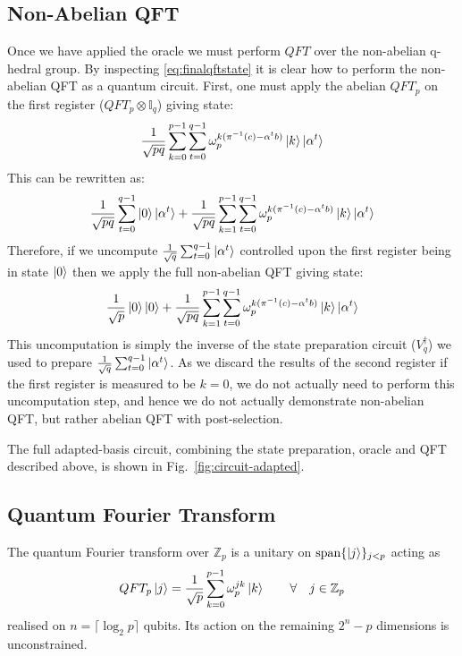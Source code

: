 \subsection{Non-Abelian QFT}
Once we have applied the oracle we must perform $QFT$ over the non-abelian q-hedral group. By inspecting \eqref{eq:finalqftstate} it is clear how to perform the non-abelian QFT as a quantum circuit. First, one must apply the abelian $QFT_p$ on the first register ($QFT_p \otimes \mathbb{I}_q$) giving state:
\begin{equation}
    \frac{1}{\sqrt{pq}} \sum_{k=0}^{p-1}\sum_{t = 0}^{q-1} \omega_p^{k (\pi^{-1}(c) - \alpha^tb)}\ket{k}\ket{\alpha^t}
\end{equation}
This can be rewritten as:
\begin{equation}
  \frac{1}{\sqrt{pq}}\sum_{t=0}^{q-1} \ket{0}\ket{\alpha^t}+ \frac{1}{\sqrt{pq}} \sum_{k=1}^{p-1}\sum_{t = 0}^{q-1} \omega_p^{k (\pi^{-1}(c) - \alpha^tb)}\ket{k}\ket{\alpha^t}
\end{equation}
Therefore, if we uncompute $\frac{1}{\sqrt{q}}\sum_{t=0}^{q-1}\ket{\alpha^t}$ controlled upon the first register being in state $\ket{0}$ then we apply the full non-abelian QFT giving state:
\begin{equation}
  \frac{1}{\sqrt{p}} \ket{0}\ket{0} +\frac{1}{\sqrt{pq}} \sum_{k=1}^{p-1}\sum_{t = 0}^{q-1} \omega_p^{k (\pi^{-1}(c) - \alpha^tb)}\ket{k}\ket{\alpha^t}
\end{equation}
This uncomputation is simply the inverse of the state preparation circuit ($V_q^{\dagger}$) we used to prepare $\frac{1}{\sqrt{q}}\sum_{t=0}^{q-1}\ket{\alpha^t}$. As we discard the results of the second register if the first register is measured to be $k=0$, we do not actually need to perform this uncomputation step, and hence we do not actually demonstrate non-abelian QFT, but rather abelian QFT with post-selection. 

The full adapted-basis circuit, combining the state preparation, oracle and QFT described above, is shown in Fig.~\ref{fig:circuit-adapted}.

\subsection{Quantum Fourier Transform}

The quantum Fourier transform over $\mathbb{Z}_p$
is a unitary on $\mathrm{span}\{\ket{j}\}_{j<p}$ acting as
\begin{equation}
    QFT_p \ket{j} = \frac{1}{\sqrt{p}}\sum_{k=0}^{p-1} \omega_p^{jk} \ket{k} \qquad \forall \quad  j \in \mathbb{Z}_p
\end{equation}
realised on $n=\lceil\log_2 p\rceil$ qubits. Its action on the remaining $2^n-p$ dimensions is unconstrained.

